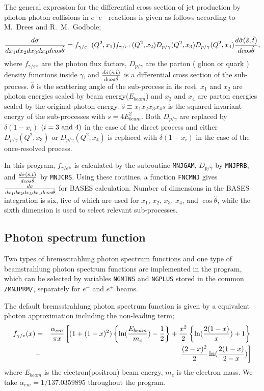 The general expression for the differential cross section 
of jet production by photon-photon collisions in $e^+e^-$ reactions
is given as follows
according to M.~Drees and R.~M.~Godbole\cite{DREESB};
\begin{eqnarray}
 {d\sigma \over dx_1 dx_2 dx_3 dx_4 dcos\hat{\theta}} = 
 f_{\gamma/e^-}(Q^2, x_1) 
         f_{\gamma/e^+}(Q^2, x_2)  
		       D_{p/\gamma}(Q^2,x_3)
	        D_{p/\gamma}(Q^2,x_4) 
	        {d\hat{\sigma}(\hat{s},\hat{t})\over dcos\hat{\theta}},
\end{eqnarray}
where $f_{\gamma/e^\pm}$ are the photon flux factors,
$D_{p/\gamma}$ are the parton ( gluon
or quark ) density functions inside $\gamma$, and
$d\hat{\sigma}(\hat{s},\hat{t})\over dcos\hat{\theta}$ is a differential
cross section of the sub-process. $\hat{\theta}$ is the
scattering angle of the sub-process in its rest.
$x_1$ and $x_2$ are photon energies scaled by beam
energy($E_{beam}$) and $x_3$ and $x_4$ are parton energies scaled by
the original photon energy. 
$\hat{s}\equiv x_1 x_2 x_3 x_4 s$ is the squared invariant energy of the 
sub-processes with $s=4 E^2_{beam}$.
Both $D_{p/\gamma}$ are replaced by $\delta(1-x_i)$ $(i=3\ {\rm and} \ 4)$
in the case of the direct process and
either $D_{p/\gamma}(Q^2,x_3)$ or $D_{p/\gamma}(Q^2,x_4)$
is replaced with $\delta(1-x_i)$ in the case of the once-resolved process.  

In this program,  $f_{\gamma/e^\pm}$ is calculated by the subroutine
{\tt MNJGAM}, $D_{p/\gamma}$ by {\tt MNJPRB}, and 
$d\hat{\sigma}(\hat{s},\hat{t})\over dcos\hat{\theta}$ by {\tt MNJCRS}.
Using these routines, a function {\tt FNCMNJ} gives
${d\sigma \over dx_1 dx_2 dx_3 dx_4 dcos\hat{\theta}}$ for BASES 
calculation.  Number of dimensions in the BASES integration
is six, five of which are used for $x_1$, $x_2$, $x_3$, $x_4$,
and $\cos\hat{\theta}$, while the sixth dimension is used
to select relevant sub-processes.


\subsection{Photon spectrum function}
Two types of bremsstrahlung photon spectrum functions and one type
of beamstrahlung photon spectrum functions are implemented
in the program, which can be selected by variables {\tt NGMINS}
and {\tt NGPLUS} stored in the common {\tt /MNJPRM/},
separately for $e^-$ and $e^+$ beams.

The default bremsstrahlung photon spectrum function is
given by a equivalent photon approximation including 
the non-leading term\cite{BKT71};
\begin{eqnarray}
f_{\gamma/e}(x) &=& {\alpha_{em} \over \pi x }
  \left[ (1 + (1-x)^2) \left\{ \ln ( {E_{beam} \over m_e } ) - 
  \frac{1}{2} \right\}
  + \frac{x^2}{2} \left\{ \ln ( {2(1-x) \over x} ) + 1 \right\} 
  \right. \nonumber \\
&+& \left. \frac{(2-x)^2}{2}\ln ( {2(1-x) \over 2-x} ) \right] 
\label{EQ_EPA}
\end{eqnarray}
\noindent where $E_{beam}$ is the electron(positron) beam energy,
$m_e$ is the electron mass.  We take $\alpha_{em}=1/137.0359895$ throughout 
the program.

